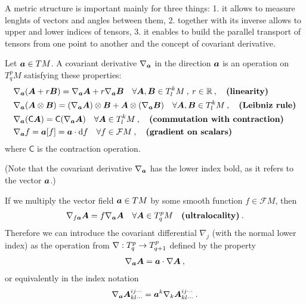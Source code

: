 A metric structure is important mainly for three things: 1. it allows to measure lenghts of vectors and angles between them, 2. together with its inverse allows to upper and lower indices of tensors, 3. it enables to build the parallel transport of tensors from one point to another and the concept of covariant derivative.

\begin{definition}
    Let $\boldsymbol{a} \in TM$. A covariant derivative $\nabla_{\boldsymbol{a}}$ in the direction $\boldsymbol{a}$ is an operation on $T^p_q M$ satisfying these properties:
    \begin{align}
        &\nabla_{\boldsymbol{a}} (\boldsymbol{A} + r \boldsymbol{B}) = \nabla_{\boldsymbol{a}} \boldsymbol{A} + r \nabla_{\boldsymbol{a}} \boldsymbol{B} \quad \forall \boldsymbol{A},\boldsymbol{B} \in T^k_l M \:,\: r \in \mathbb{R} \:, \quad \textbf{(linearity)} \\
        &\nabla_{\boldsymbol{a}} (\boldsymbol{A} \otimes \boldsymbol{B}) = (\nabla_{\boldsymbol{a}} \boldsymbol{A}) \otimes \boldsymbol{B} + \boldsymbol{A} \otimes (\nabla_{\boldsymbol{a}} \boldsymbol{B}) \quad \forall \boldsymbol{A},\boldsymbol{B} \in T^k_l M \:, \quad \textbf{(Leibniz rule)} \\
        &\nabla_{\boldsymbol{a}} (\mathsf{C} \boldsymbol{A}) = \mathsf{C} (\nabla_{\boldsymbol{a}} \boldsymbol{A}) \quad \forall \boldsymbol{A} \in T^k_l M \:, \quad \textbf{(commutation with contraction)} \\
        &\nabla_{\boldsymbol{a}} f = \boldsymbol{a}[f] = \boldsymbol{a} \cdot \mathrm{d} f \quad \forall f \in \mathcal F M \:, \quad \textbf{(gradient on scalars)}
    \end{align}
    where $\mathsf{C}$ is the contraction operation.
\end{definition}
(Note that the covariant derivative $\nabla_{\boldsymbol{a}}$ has the lower index bold, as it refers to the vector $\boldsymbol{a}$.)

If we multiply the vector field $\boldsymbol{a} \in T M$ by some smooth function $f \in \mathcal F M$, then
\begin{align}
    \nabla_{f \boldsymbol{a}} \boldsymbol{A} = f \nabla_{\boldsymbol{a}} \boldsymbol{A} \quad \forall \boldsymbol{A} \in T^p_q M \quad \textbf{(ultralocality)}\:.
\end{align}
Therefore we can introduce the covariant differential $\nabla_j$ (with the normal lower index) as the operation from $\nabla : T^p_q \to T^p_{q+1}$ defined by the property
\begin{align}
    \nabla_{\boldsymbol{a}} \boldsymbol{A} = \boldsymbol{a} \cdot \nabla \boldsymbol{A} \:,
\end{align} 
or equivalently in the index notation
\begin{align}
    \nabla_{\boldsymbol{a}} \boldsymbol{A}^{ij\cdots}_{kl\cdots} = \boldsymbol{a}^k \nabla_k \boldsymbol{A}^{ij\cdots}_{kl\cdots} \:.
\end{align}

